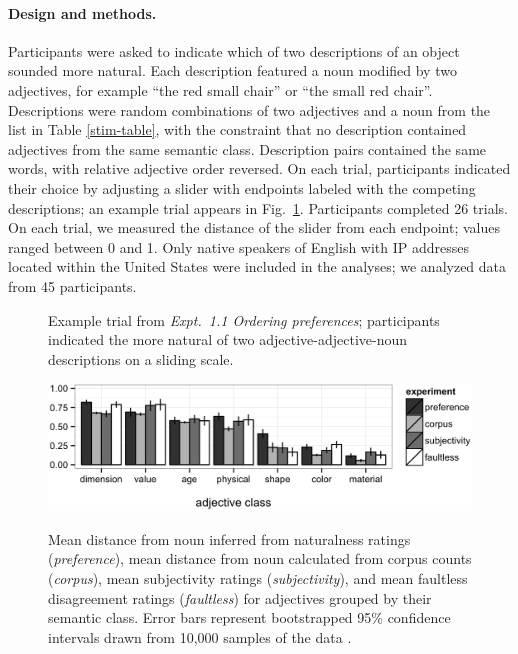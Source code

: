 \documentclass[12pt]{article}
\begin{document}
\paragraph{Design and methods.} Participants were asked to indicate which of two descriptions of an object sounded more natural. Each description featured a noun modified by two adjectives, for example ``the red small chair'' or ``the small red chair''. Descriptions were random combinations of two adjectives and a noun from the list in Table \ref{stim-table}, with the constraint that no description contained adjectives from the same semantic class. Description pairs contained the same words, with relative adjective order reversed. 
On each trial, participants indicated their choice by adjusting a slider with endpoints labeled with the competing descriptions; an example trial appears in Fig.\ \ref{order-trial}. Participants completed 26 trials. On each trial, we measured the distance of the slider from each endpoint; values ranged between 0 and 1. Only native speakers of English with IP addresses located within the United States were included in the analyses; we analyzed data from 45 participants. 

\begin{figure}[h]
	\centering
	\caption{Example trial from \emph{Expt.\ 1.1 Ordering preferences}; participants indicated the more natural of two adjective-adjective-noun descriptions on a sliding scale.}\label{order-trial}
\end{figure}

\begin{figure}[tbh]
	\centering
	{\includegraphics[width=.75\linewidth]{plots/expt_results-new.eps}}\par
	\caption{Mean distance from noun inferred from naturalness ratings (\emph{preference}), mean distance from noun calculated from corpus counts (\emph{corpus}), mean subjectivity ratings (\emph{subjectivity}), and mean faultless disagreement ratings (\emph{faultless}) for adjectives grouped by their semantic class. Error bars represent bootstrapped 95\% confidence intervals drawn from 10,000 samples of the data \citep{DiCiccio1996}.}\label{results}
\end{figure}
\end{document}
